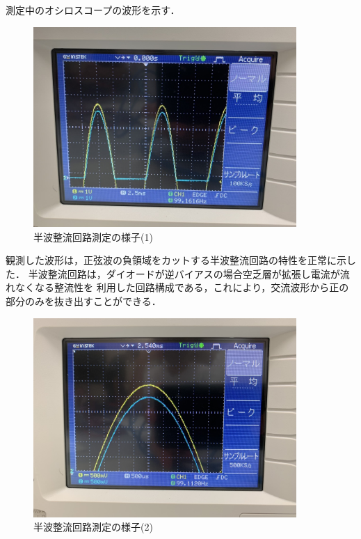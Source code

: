 \documentclass[titlepage]{jarticle}
\begin{document}
測定中のオシロスコープの波形を示す．
\begin{figure}[H]
    \begin{center}
        \includegraphics[width=10cm]{image/diode/S__19873810.jpg}
        \caption{半波整流回路測定の様子(1)}
        \label{fig:半波整流回路測定の様子(1)}
    \end{center}
\end{figure}

観測した波形は，正弦波の負領域をカットする半波整流回路の特性を正常に示した．
半波整流回路は，ダイオードが逆バイアスの場合空乏層が拡張し電流が流れなくなる整流性を
利用した回路構成である，これにより，交流波形から正の部分のみを抜き出すことができる．

\begin{figure}[H]
    \begin{center}
        \includegraphics[width=10cm]{image/diode/S__19873806.jpg}
        \caption{半波整流回路測定の様子(2)}
        \label{fig:半波整流回路測定の様子(2)}
    \end{center}
\end{figure}
\end{document}
